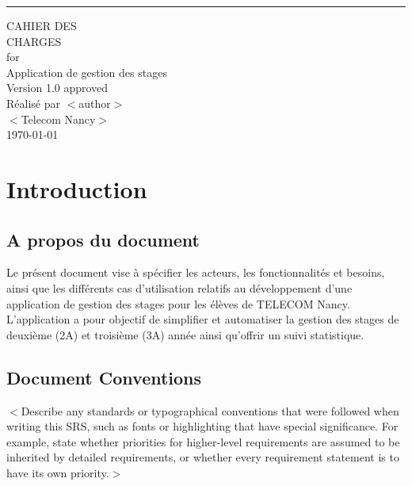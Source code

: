 \documentclass{scrreprt}
\date{}
\def\myversion{1.0 }
\begin{document}
\begin{flushright}
    \rule{16cm}{5pt}\vskip1cm
	\centering
    \begin{bfseries}
        \Huge{CAHIER DES\\ CHARGES}\\
        \vspace{1.9cm}
        for\\
        \vspace{1.9cm}
        Application de gestion des stages\\
        \vspace{1.9cm}
        \LARGE{Version \myversion approved}\\
        \vspace{1.9cm}
        Réalisé par $<$author$>$\\
        \vspace{1.9cm}
        $<$Telecom Nancy$>$\\
        \vspace{1.9cm}
        \today\\
    \end{bfseries}

\end{flushright}




\chapter{Introduction}

\section{A propos du document}
Le présent document vise à spécifier les acteurs, les fonctionnalités et besoins, ainsi que les différents cas d’utilisation relatifs au développement d’une application de gestion des stages pour les élèves de TELECOM Nancy. L’application a pour objectif de simplifier et automatiser la gestion des stages de deuxième (2A) et troisième (3A) année ainsi qu’offrir un suivi statistique.

\section{Document Conventions}
$<$Describe any standards or typographical conventions that were followed when 
writing this SRS, such as fonts or highlighting that have special significance.  
For example, state whether priorities  for higher-level requirements are assumed 
to be inherited by detailed requirements, or whether every requirement statement 
is to have its own priority.$>$
\end{document}
